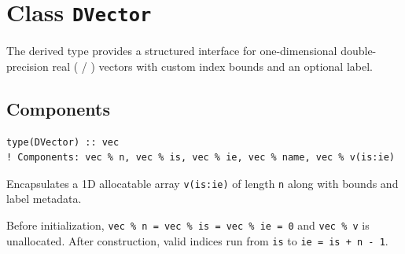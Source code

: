 \section{Class \texttt{DVector}}
\label{sec:class_dvector}

The  derived type provides a structured interface for one-dimensional double-precision real ( / ) vectors with custom index bounds and an optional label.

\subsection{Components}
\label{subsec:dvec_components}


\lstset{language=[95]Fortran}
\begin{lstlisting}
type(DVector) :: vec
! Components: vec % n, vec % is, vec % ie, vec % name, vec % v(is:ie)
\end{lstlisting}

Encapsulates a 1D allocatable  array \texttt{v(is:ie)} of length \texttt{n} along with bounds and label metadata.

Before initialization, \texttt{vec \% n = vec \% is = vec \% ie = 0} and \texttt{vec \% v} is unallocated. After construction, valid indices run from \texttt{is} to \texttt{ie = is + n - 1}.

\begin{description}[leftmargin=2.2cm, style=nextline]
\end{description}


